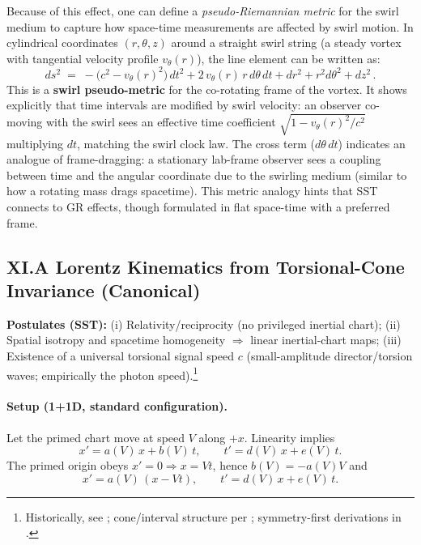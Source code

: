 \documentclass[10pt,reprint,aps,onecolumn,nofootinbib]{revtex4-2}
\begin{document}
	Because of this effect, one can define a \emph{pseudo-Riemannian metric} for the swirl medium to capture how space-time measurements are affected by swirl motion. In cylindrical coordinates $(r,\theta,z)$ around a straight swirl string (a steady vortex with tangential velocity profile $v_{\theta}(r)$), the line element can be written as:
	\[
		ds^2 \;=\; -\big(c^2 - v_{\theta}(r)^2\big)\,dt^2 + 2\,v_{\theta}(r)\,r\,d\theta\,dt + dr^2 + r^2 d\theta^2 + dz^2\,.
	\]
	This is a \textbf{swirl pseudo-metric} for the co-rotating frame of the vortex. It shows explicitly that time intervals are modified by swirl velocity: an observer co-moving with the swirl sees an effective time coefficient $\sqrt{1 - v_{\theta}(r)^2/c^2}$ multiplying $dt$, matching the swirl clock law. The cross term ($d\theta\,dt$) indicates an analogue of frame-dragging: a stationary lab-frame observer sees a coupling between time and the angular coordinate due to the swirling medium (similar to how a rotating mass drags spacetime). This metric analogy hints that SST connects to GR effects, though formulated in flat space-time with a preferred frame.


    \subsection*{XI.A \; Lorentz Kinematics from Torsional-Cone Invariance (Canonical)}
        \textbf{Postulates (SST):} (i) Relativity/reciprocity (no privileged inertial chart); (ii) Spatial isotropy and spacetime homogeneity $\Rightarrow$ linear inertial-chart maps; (iii) Existence of a universal torsional signal speed $c$ (small-amplitude director/torsion waves; empirically the photon speed).\footnote{Historically, see \cite{Einstein1905}; cone/interval structure per \cite{Minkowski1909}; symmetry-first derivations in \cite{LevyLeblond1976}.}

        \paragraph{Setup (1+1D, standard configuration).}
            Let the primed chart move at speed $V$ along $+x$. Linearity implies
            \begin{equation}
                x' = a(V)\,x + b(V)\,t,\qquad t' = d(V)\,x + e(V)\,t. \label{eq:lin}
            \end{equation}
            The primed origin obeys $x'=0 \Rightarrow x=Vt$, hence $b(V)=-a(V)V$ and
            \begin{equation}
                x' = a(V)\,(x - Vt), \qquad t' = d(V)\,x + e(V)\,t. \label{eq:std}
            \end{equation}
\end{document}
